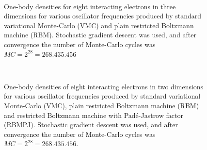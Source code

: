 \begin{figure} [H]%
	\centering
	\\
	
	\caption{One-body densities for eight interacting electrons in three dimensions for various oscillator frequencies produced by standard variational Monte-Carlo (VMC) and plain restricted Boltzmann machine (RBM). Stochastic gradient descent was used, and after convergence the number of Monte-Carlo cycles was $MC=2^{28}=268.435.456$}%
	\label{fig:OB_interaction_8P_3D}
\end{figure}

\begin{figure} [H]%
	\centering
	\\
	
	\caption{One-body densities of eight interacting electrons in two dimensions for various oscillator frequencies produced by standard variational Monte-Carlo (VMC), plain restricted Boltzmann machine (RBM) and restricted Boltzmann machine with Padé-Jastrow factor (RBMPJ). Stochastic gradient descent was used, and after convergence the number of Monte-Carlo cycles was $MC=2^{28}=268.435.456$.}%
	\label{fig:OB_interaction_12P_3D}
\end{figure}